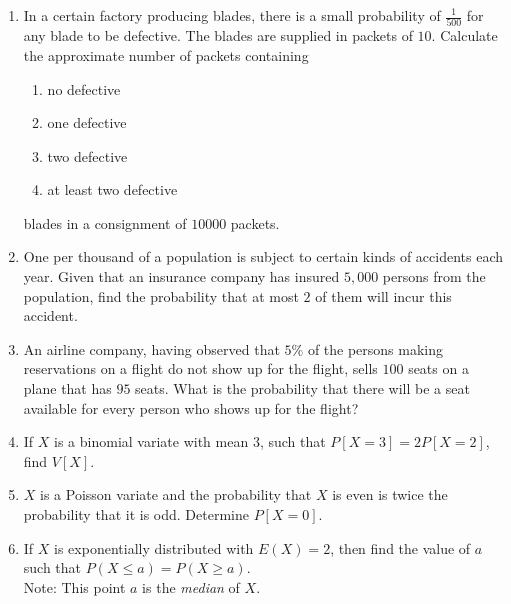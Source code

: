 \documentclass[svgnames]{amsart}
\begin{document}
\begin{enumerate}[leftmargin=*]
\item In a certain factory producing blades, there is a small probability of $\frac{1}{500}$ for any blade to be defective. The blades are supplied in packets of $10$. Calculate the approximate number of packets containing
\begin{enumerate}[label=(\roman*)]
	\item no defective
	\item one defective
	\item two defective
	\item at least two defective
\end{enumerate}
blades in a consignment of $10000$ packets.

\item One per thousand of a population is subject to certain kinds of accidents each year. Given that an insurance company has insured $5,000$ persons from the population, find the probability that at most $2$ of them will incur this accident.

\item An airline company, having observed that $5\%$ of the persons making reservations on a flight do not show up for the flight, sells $100$ seats on a plane that has $95$ seats. What is the probability that there will be a seat available for every person who shows up for the flight?

\item If $X$ is a binomial variate with mean $3$, such that $P[X = 3] = 2P[X = 2]$, find $V[X]$.

\item $X$ is a Poisson variate and the probability that $X$ is even is twice the probability that it is odd. Determine $P[X = 0]$.

\item  If $X$ is exponentially distributed with $E(X) = 2$, then find the value of $a$ such that $P(X \le a) = P(X \ge a)$.\\
{\small\color{blue!40!black}
		Note: This point $a$ is the \emph{median} of $X$.
}


\end{enumerate}
\end{document}
